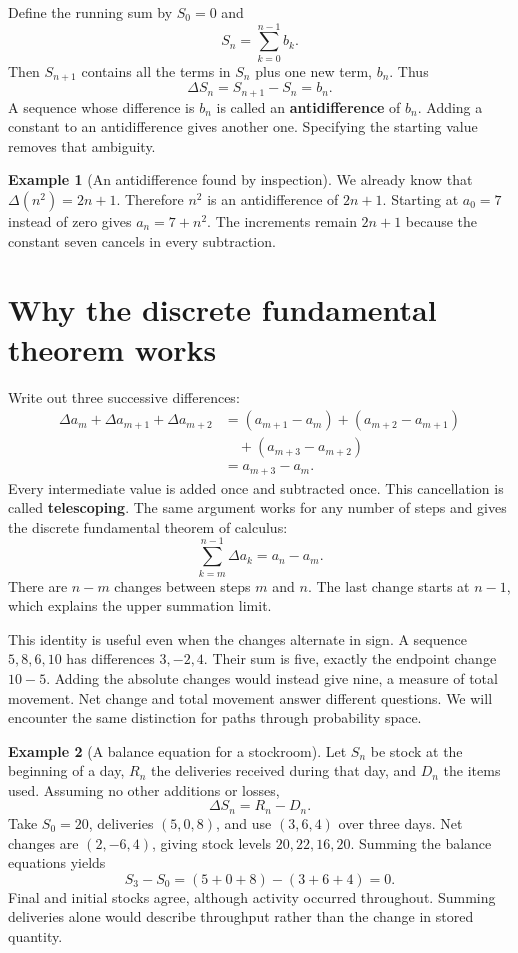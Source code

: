 \documentclass[11pt,oneside,openany]{book}
\theoremstyle{definition}
\newtheorem{example}{Example}[chapter]
\theoremstyle{remark}
\numberwithin{equation}{chapter}
\begin{document}
Define the running sum by \(S_0=0\) and \[S_n=\sum_{k=0}^{n-1}b_k.\] Then \(S_{n+1}\) contains all the terms in \(S_n\) plus one new term, \(b_n\). Thus \[\Delta S_n=S_{n+1}-S_n=b_n.\] A sequence whose difference is \(b_n\) is called an \textbf{antidifference} of \(b_n\). Adding a constant to an antidifference gives another one. Specifying the starting value removes that ambiguity.

\begin{example}[An antidifference found by inspection]

We already know that \(\Delta(n^2)=2n+1\). Therefore \(n^2\) is an antidifference of \(2n+1\). Starting at \(a_0=7\) instead of zero gives \(a_n=7+n^2\). The increments remain \(2n+1\) because the constant seven cancels in every subtraction.

\end{example}

\section{Why the discrete fundamental theorem works}\label{ch01-why-the-discrete-fundamental-theorem-works}

Write out three successive differences: \[\begin{aligned}
\Delta a_m+\Delta a_{m+1}+\Delta a_{m+2}
&=(a_{m+1}-a_m)+(a_{m+2}-a_{m+1})\\
&\quad +(a_{m+3}-a_{m+2})\\
&=a_{m+3}-a_m.
\end{aligned}\] Every intermediate value is added once and subtracted once. This cancellation is called \textbf{telescoping}. The same argument works for any number of steps and gives the discrete fundamental theorem of calculus: \[\boxed{\sum_{k=m}^{n-1}\Delta a_k=a_n-a_m.}\] There are \(n-m\) changes between steps \(m\) and \(n\). The last change starts at \(n-1\), which explains the upper summation limit.

This identity is useful even when the changes alternate in sign. A sequence \(5,8,6,10\) has differences \(3,-2,4\). Their sum is five, exactly the endpoint change \(10-5\). Adding the absolute changes would instead give nine, a measure of total movement. Net change and total movement answer different questions. We will encounter the same distinction for paths through probability space.

\begin{example}[A balance equation for a stockroom]

Let \(S_n\) be stock at the beginning of a day, \(R_n\) the deliveries received during that day, and \(D_n\) the items used. Assuming no other additions or losses, \[\Delta S_n=R_n-D_n.\] Take \(S_0=20\), deliveries \((5,0,8)\), and use \((3,6,4)\) over three days. Net changes are \((2,-6,4)\), giving stock levels \(20,22,16,20\). Summing the balance equations yields \[S_3-S_0=(5+0+8)-(3+6+4)=0.\] Final and initial stocks agree, although activity occurred throughout. Summing deliveries alone would describe throughput rather than the change in stored quantity.

\end{example}
\end{document}
